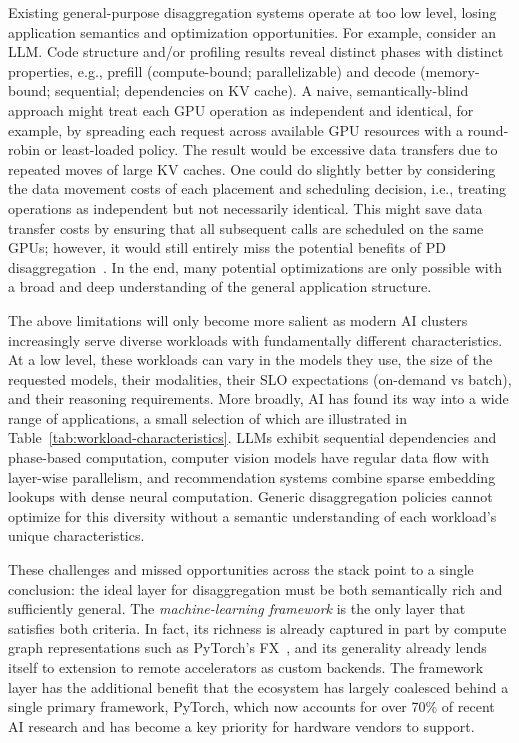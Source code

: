 Existing general-purpose disaggregation systems operate at too low level,
  losing application semantics and optimization opportunities.
For example, consider an LLM.
Code structure and/or profiling results reveal distinct phases with distinct properties, e.g., prefill (compute-bound; parallelizable) and decode (memory-bound; sequential; dependencies on KV cache).
A naive, semantically-blind approach might treat each GPU operation as independent and identical, for example, by spreading each request across available GPU resources with a round-robin or least-loaded policy.
The result would be excessive data transfers due to repeated moves of large KV caches.
One could do slightly better by considering the data movement costs of each placement and scheduling decision, i.e., treating operations as independent but not necessarily identical.
This might save data transfer costs by ensuring that all subsequent calls are scheduled on the same GPUs;
however, it would still entirely miss the potential benefits of PD disaggregation~\cite{patel2023splitwise}.
In the end, many potential optimizations are only possible with a broad and deep understanding of the general application structure.

The above limitations will only become more salient as modern AI clusters increasingly serve diverse workloads with fundamentally different characteristics.
At a low level, these workloads can vary in the models they use, the size of the requested models, their modalities, their SLO expectations (on-demand vs batch), and their reasoning requirements.
More broadly, AI has found its way into a wide range of applications, a small selection of which are illustrated in Table~\ref{tab:workload-characteristics}.
LLMs exhibit sequential dependencies and phase-based computation, computer vision models have regular data flow with layer-wise parallelism, and recommendation systems combine sparse embedding lookups with dense neural computation. 
Generic disaggregation policies cannot optimize for this diversity without a semantic understanding of each workload's unique characteristics.

These challenges and missed opportunities across the stack point to a single conclusion: the ideal layer for disaggregation must be both semantically rich and sufficiently general.
The \emph{machine-learning framework} is the only layer that satisfies both criteria.
In fact, its richness is already captured in part by compute graph representations such as PyTorch's FX~\cite{torchfx}, and its generality already lends itself to extension to remote accelerators as custom backends.
The framework layer has the additional benefit that the ecosystem has largely coalesced behind a single primary framework, PyTorch, which now accounts for over 70\% of recent AI research and has become a key priority for hardware vendors to support.

